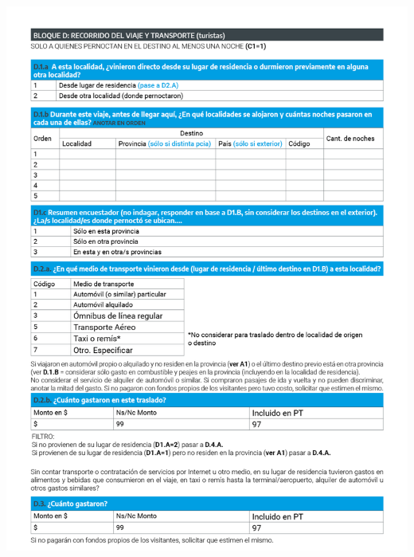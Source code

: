 \documentclass[
]{book}
\begin{document}
\begin{center}\includegraphics[width=1\linewidth]{imagenes/graf05} \end{center}
\end{document}

